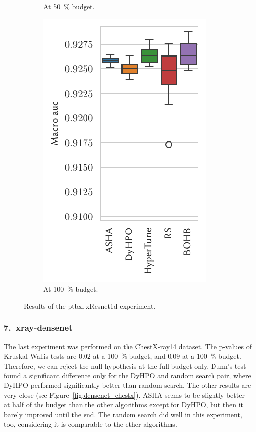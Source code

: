 \begin{figure}[H]
\begin{subfigure}{.26\textwidth}
        \caption{At \SI{50}{\percent} budget.}%
    \end{subfigure}%
    \begin{subfigure}{.26\textwidth}
        \includegraphics[height=\plotheight]{img/real_exp/ptbxl_xResNet1d_boxplot_full.pdf}%
        \caption{At \SI{100}{\percent} budget.}%
    \end{subfigure}%
\caption{Results of the ptbxl-xResnet1d experiment.}
\label{fig:xresnet_ptbxl}
\end{figure}


\subsubsection{7.\ xray-densenet}
The last experiment was performed on the ChestX-ray14 dataset. The p-values of Kruskal-Wallis tests are $0.02$ at a \SI{100}{\percent} budget, and $0.09$ at a \SI{100}{\percent} budget. Therefore, we can reject the null hypothesis at the full budget only. Dunn's test found a significant difference only for the DyHPO and random search pair, where DyHPO performed significantly better than random search. The other results are very close (see Figure~\ref{fig:densenet_chestx}). ASHA seems to be slightly better at half of the budget than the other algorithms except for DyHPO, but then it barely improved until the end. The random search did well in this experiment, too, considering it is comparable to the other algorithms.

